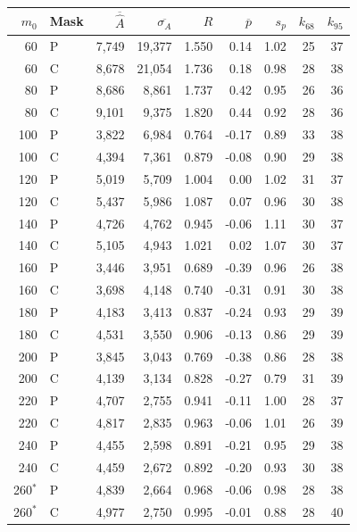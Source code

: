 \begin{tabular}{rlrrrrrrr}
\toprule
$m_0$ & Mask & $\overline{\widehat A}$ & $\overline{\sigma_A}$ & $R$ & $\overline p$ & $s_p$ & $k_{68}$ & $k_{95}$ \\
\midrule
60 & P & 7,749 & 19,377 & 1.550 & 0.14 & 1.02 & 25 & 37 \\
60 & C & 8,678 & 21,054 & 1.736 & 0.18 & 0.98 & 28 & 38 \\
80 & P & 8,686 & 8,861 & 1.737 & 0.42 & 0.95 & 26 & 36 \\
80 & C & 9,101 & 9,375 & 1.820 & 0.44 & 0.92 & 28 & 36 \\
100 & P & 3,822 & 6,984 & 0.764 & -0.17 & 0.89 & 33 & 38 \\
100 & C & 4,394 & 7,361 & 0.879 & -0.08 & 0.90 & 29 & 38 \\
120 & P & 5,019 & 5,709 & 1.004 & 0.00 & 1.02 & 31 & 37 \\
120 & C & 5,437 & 5,986 & 1.087 & 0.07 & 0.96 & 30 & 38 \\
140 & P & 4,726 & 4,762 & 0.945 & -0.06 & 1.11 & 30 & 37 \\
140 & C & 5,105 & 4,943 & 1.021 & 0.02 & 1.07 & 30 & 37 \\
160 & P & 3,446 & 3,951 & 0.689 & -0.39 & 0.96 & 26 & 38 \\
160 & C & 3,698 & 4,148 & 0.740 & -0.31 & 0.91 & 30 & 38 \\
180 & P & 4,183 & 3,413 & 0.837 & -0.24 & 0.93 & 29 & 39 \\
180 & C & 4,531 & 3,550 & 0.906 & -0.13 & 0.86 & 29 & 39 \\
200 & P & 3,845 & 3,043 & 0.769 & -0.38 & 0.86 & 28 & 38 \\
200 & C & 4,139 & 3,134 & 0.828 & -0.27 & 0.79 & 31 & 39 \\
220 & P & 4,707 & 2,755 & 0.941 & -0.11 & 1.00 & 28 & 37 \\
220 & C & 4,817 & 2,835 & 0.963 & -0.06 & 1.01 & 26 & 39 \\
240 & P & 4,455 & 2,598 & 0.891 & -0.21 & 0.95 & 29 & 38 \\
240 & C & 4,459 & 2,672 & 0.892 & -0.20 & 0.93 & 30 & 38 \\
260$^{*}$ & P & 4,839 & 2,664 & 0.968 & -0.06 & 0.98 & 28 & 38 \\
260$^{*}$ & C & 4,977 & 2,750 & 0.995 & -0.01 & 0.88 & 28 & 40 \\
\bottomrule
\end{tabular}
